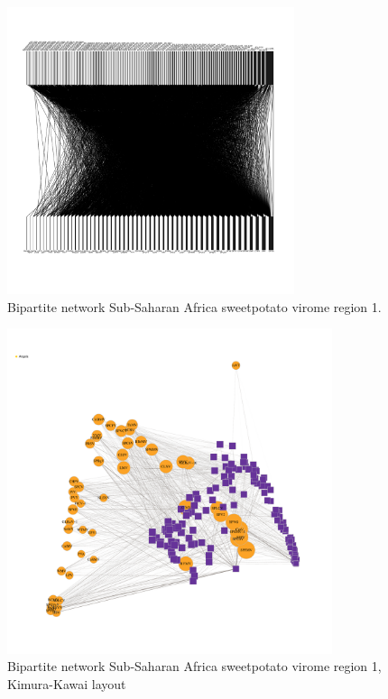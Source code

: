 \documentclass{article}
\begin{document}
\begin{figure}[h!]
\begin{center}
\includegraphics[width=0.75\textwidth]{../results/k-cluster7/7-kcluster_bipartitenetwork_Feb28.pdf
} %
\caption{Bipartite network Sub-Saharan Africa sweetpotato virome region 1.}
\end{center}
\end{figure}



\begin{figure}[h!]
\begin{center}
\includegraphics[width=0.85\textwidth]{../results/k-cluster7/7-kcluster_bipartitenetwork-kk_Feb28.pdf
} %
\caption{Bipartite network Sub-Saharan Africa sweetpotato virome region 1, Kimura-Kawai layout}
\end{center}
\end{figure}
\end{document}
